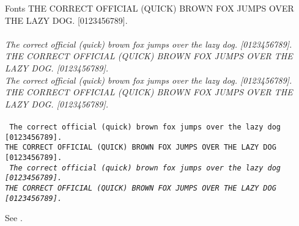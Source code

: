 \documentclass[12pt]{PalisadesLakesArticle}
\begin{document}
\begin{plSection}{Fonts}
{{THE CORRECT OFFICIAL (QUICK) BROWN FOX JUMPS OVER THE LAZY DOG. [0123456789].\\ }}
 \\
\textsf{\textsl{
The correct official (quick) brown fox jumps over the lazy dog. [0123456789].\\
THE CORRECT OFFICIAL (QUICK) BROWN FOX JUMPS OVER THE LAZY DOG. [0123456789].\\ }}
\textsf{\textit{
The correct official (quick) brown fox jumps over the lazy dog. [0123456789].\\
THE CORRECT OFFICIAL (QUICK) BROWN FOX JUMPS OVER THE LAZY DOG. [0123456789].\\ }}
 \\
\texttt{
The correct official (quick) brown fox jumps over the lazy dog [0123456789].\\
THE CORRECT OFFICIAL (QUICK) BROWN FOX JUMPS OVER THE LAZY DOG [0123456789].\\ }
\texttt{\textsl{
The correct official (quick) brown fox jumps over the lazy dog [0123456789].\\
THE CORRECT OFFICIAL (QUICK) BROWN FOX JUMPS OVER THE LAZY DOG [0123456789].\\ }}


See 
.

\end{plSection}%
\end{document}
